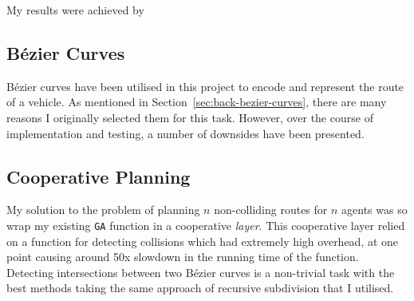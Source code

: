 My results were achieved by
\subsection{Bézier Curves}

Bézier curves have been utilised in this project to encode and represent the route of a vehicle. As mentioned in Section~\ref{sec:back-bezier-curves}, there are many reasons I originally selected them for this task. However, over the course of implementation and testing, a number of downsides have been presented.

\subsection{Cooperative Planning}
\label{subsec:eval-cooperativeplanning}

My solution to the problem of planning $n$ non-colliding routes for $n$ agents was so wrap my existing \texttt{GA} function in a cooperative \textit{layer}. This cooperative layer relied on a function for detecting collisions which had extremely high overhead, at one point causing around 50x slowdown in the running time of the function. Detecting intersections between two Bézier curves is a non-trivial task with the best methods taking the same approach of recursive subdivision that I utilised.






